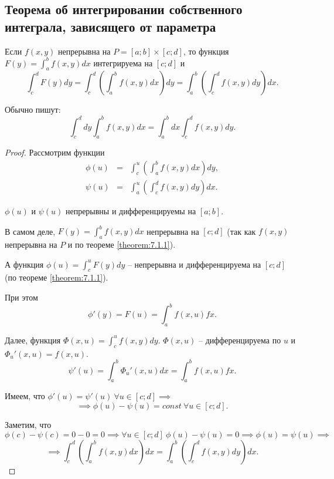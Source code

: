 \subsection{Теорема об интегрировании собственного интеграла, зависящего от параметра}

\begin{theorem}\label{theorem:7.1.3}
    Если $ f(x,y) $ непрерывна на $ P = [a;b] \times [c;d] $, то функция $ F(y) = \int_{a}^{b}f(x,y)dx $ интегрируема на $ [c;d] $ и
    \[
        \int_{c}^{d}F(y)dy = \int_{c}^{d}\left(\int_{a}^{b}f(x,y)dx\right)dy = \int_{a}^{b}\left(\int_{c}^{d}f(x,y)dy\right)dx.
    \]

    Обычно пишут:
    \[
        \int_{c}^{d}dy \int_{a}^{b}f(x,y)dx = \int_{a}^{b}dx \int_{c}^{d}f(x,y)dy.
    \]
\end{theorem}

\begin{proof}
    Рассмотрим функции
    \begin{eqnarray*}
        \phi(u) &=& \int_{c}^{u}\left(\int_{a}^{b}f(x,y)dx\right)dy, \\
        \psi(u) &=& \int_{a}^{u}\left(\int_{c}^{d}f(x,y)dy\right)dx.
    \end{eqnarray*}

    $ \phi(u) $ и $ \psi(u) $ непрерывны и дифференцируемы на $ [a;b] $.

    В самом деле, $ F(y) = \int_{a}^{b}f(x,y)dx $ непрерывна на $ [c;d] $ (так как $ f(x,y) $ непрерывна на $ P $ и по теореме \ref{theorem:7.1.1}).

    А функция $ \phi(u) = \int_{c}^{u}F(y)dy $ -- непрерывна и дифференцируема на $ [c;d] $ (по теореме \ref{theorem:7.1.1}).

    При этом
    \[
        \phi'(y) = F(u) = \int_{a}^{b}f(x,u)fx.
    \]

    Далее, функция $ \Phi(x,u) = \int_{c}^{u}f(x,y)dy $. $ \Phi(x,u) $ -- дифференцируема по $ u $ и $ \Phi_u'(x,u) = f(x,u) $.
    \[
        \psi'(u) = \int_{a}^{b}\Phi_u'(x,u)dx = \int_{a}^{b}f(x,u)fx.
    \]

    Имеем, что $ \phi'(u) = \psi'(u) \ \forall u \in [c;d] \implies $
    \[
        \implies \phi(u) - \psi(u) = const \ \forall u \in [c;d].
    \]

    Заметим, что $ \phi(c) - \psi(c) = 0 - 0 = 0 \implies \forall u \in [c;d] \ \phi(u) - \psi(u) = 0 \implies \phi(u) = \psi(u) \implies $
    \[
        \implies \int_{c}^{d}\left(\int_{a}^{b}f(x,y)dx\right)dx = \int_{a}^{b}\left(\int_{c}^{d}f(x,y)dy\right)dx.
    \]
\end{proof}


